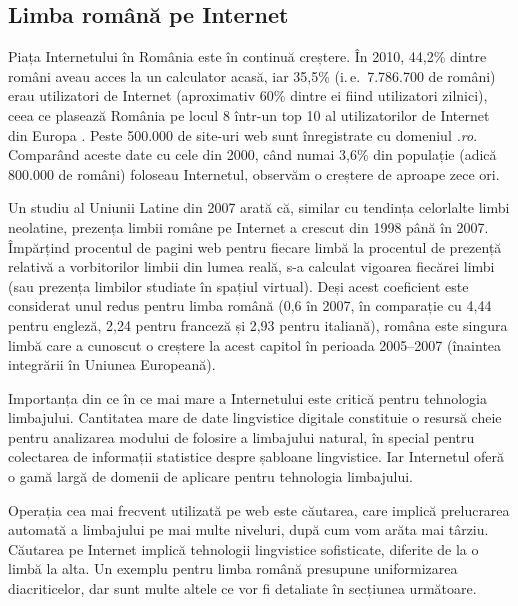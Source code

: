 \begin{multicols}{2}
\subsection{Limba română pe Internet}

Piața Internetului în România este în continuă creștere. În 2010, 44,2\% dintre români aveau acces la un calculator acasă, iar 35,5\% (i.\,e.~7.786.700 de români) erau utilizatori de Internet \cite{urlInternetStatsRO} (aproximativ 60\% dintre ei fiind utilizatori zilnici), ceea ce plasează România pe locul 8 într-un top 10 al utilizatorilor de Internet din Europa \cite{urlInternetStatsEU}. Peste 500.000 de site-uri web sunt înregistrate cu domeniul \textit{.ro}. Comparând aceste date cu cele din 2000, când numai 3,6\% din populație (adică 800.000 de români) foloseau Internetul, observăm o creștere de aproape zece ori.

Un studiu al Uniunii Latine din 2007 \cite{uniunealat} arată că, similar cu tendința celorlalte limbi neolatine, prezența limbii române pe Internet a crescut din 1998 până în 2007. Împărțind procentul de pagini web pentru fiecare limbă la procentul de prezență relativă a vorbitorilor limbii din lumea reală, s-a calculat vigoarea fiecărei limbi (sau prezența limbilor studiate în spațiul virtual). Deși acest coeficient este considerat unul redus pentru limba română (0,6 în 2007, în comparație cu 4,44 pentru engleză, 2,24 pentru franceză și 2,93 pentru italiană), româna este singura limbă care a cunoscut o creștere la acest capitol în perioada 2005--2007 (înaintea integrării în Uniunea Europeană).


Importanța din ce în ce mai mare a Internetului este critică pentru tehnologia limbajului. Cantitatea mare de date lingvistice digitale constituie o resursă cheie pentru analizarea modului de folosire a limbajului natural, în special pentru colectarea de informații statistice despre șabloane lingvistice. Iar Internetul oferă o gamă largă de domenii de aplicare pentru tehnologia limbajului.

Operația cea mai frecvent utilizată pe web este căutarea, care implică prelucrarea automată a limbajului pe mai multe niveluri, după cum vom arăta mai târziu. Căutarea pe Internet implică tehnologii lingvistice sofisticate, diferite de la o limbă la alta. Un exemplu pentru limba română presupune uniformizarea diacriticelor, dar sunt multe altele ce vor fi detaliate în secțiunea următoare.


\end{multicols}
